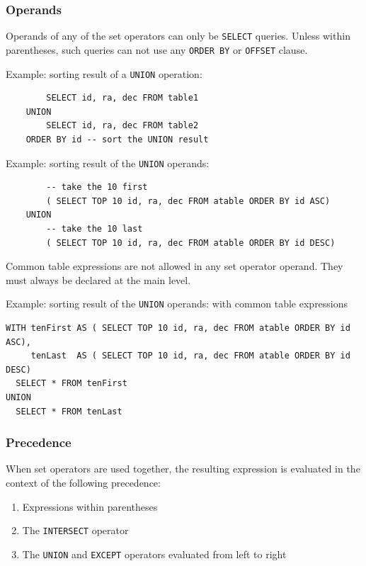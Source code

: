\documentclass[11pt,a4paper]{ivoa}
\begin{document}
\subsubsection{Operands}

Operands of any of the set operators can only be \verb:SELECT: queries.
Unless within parentheses, such queries can not use any \verb:ORDER BY: or
\verb:OFFSET: clause.

Example: sorting result of a \verb:UNION: operation:

\begin{verbatim}
        SELECT id, ra, dec FROM table1
    UNION
        SELECT id, ra, dec FROM table2
    ORDER BY id -- sort the UNION result
\end{verbatim}

Example: sorting result of the \verb:UNION: operands:

\begin{verbatim}
        -- take the 10 first
        ( SELECT TOP 10 id, ra, dec FROM atable ORDER BY id ASC)
    UNION
        -- take the 10 last
        ( SELECT TOP 10 id, ra, dec FROM atable ORDER BY id DESC)
\end{verbatim}

Common table expressions are not allowed in any set operator operand. They must
always be declared at the main level.

Example: sorting result of the \verb:UNION: operands: with common table
expressions

\begin{verbatim}
WITH tenFirst AS ( SELECT TOP 10 id, ra, dec FROM atable ORDER BY id ASC),
     tenLast  AS ( SELECT TOP 10 id, ra, dec FROM atable ORDER BY id DESC)
  SELECT * FROM tenFirst
UNION
  SELECT * FROM tenLast
\end{verbatim}

\subsubsection{Precedence}

When set operators are used together, the resulting expression is
evaluated in the context of the following precedence:

\begin{enumerate}
    \item Expressions within parentheses
    \item The \verb:INTERSECT: operator
    \item The \verb:UNION: and \verb:EXCEPT: operators evaluated from left to right
\end{enumerate}
\end{document}
